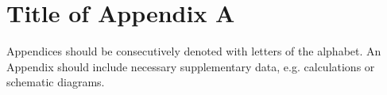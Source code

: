 \chapter{Title of Appendix A}

Appendices should be consecutively denoted with letters of the alphabet. An Appendix should include necessary supplementary data, e.g. calculations or schematic diagrams.